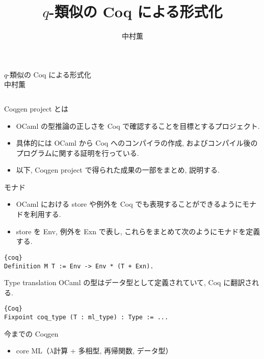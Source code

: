 \documentclass[unicode,mathserif]{beamer}
\title{$q$-類似の Coq による形式化}
\author{中村薫}
\begin{document}
\begin{frame}[fragile]
  \begin{screen}
    \begin{center}
      {\Huge $q$-類似の Coq による形式化} \\
      {\Large 中村薫} 
    \end{center}
  \end{screen}

  \begin{columns}[T]
    \begin{column}{0.33\columnwidth}
      \begin{block}{Coqgen project とは}
        \begin{itemize}
          \item OCaml の型推論の正しさを Coq で確認することを目標とするプロジェクト. 
          \item 具体的には OCaml から Coq へのコンパイラの作成, およびコンパイル後のプログラムに関する証明を行っている. 
          \item 以下, Coqgen project で得られた成果の一部をまとめ, 説明する.
        \end{itemize} 
      \end{block}
      \begin{block}{モナド}
        \begin{itemize}
          \item OCaml における store や例外を Coq でも表現することができるようにモナドを利用する. 
          \item store を Env, 例外を Exn で表し, これらをまとめて次のようにモナドを定義する. 
        \end{itemize}
        \begin{lstlisting}{coq}
Definition M T := Env -> Env * (T + Exn).  \end{lstlisting}
      \end{block}
      \begin{block}{Type translation}
        OCaml の型はデータ型として定義されていて, Coq に翻訳される. 
        \begin{lstlisting}{Coq}
Fixpoint coq_type (T : ml_type) : Type := ...  \end{lstlisting}
      \end{block}
      \begin{block}{今までの Coqgen}
        \begin{itemize}
          \item core ML（$\lambda$計算 $+$ 多相型, 再帰関数, データ型）

\end{itemize}
\end{block}
\end{column}
\end{columns}
\end{frame}
\end{document}
